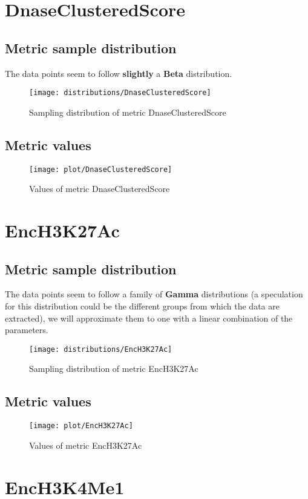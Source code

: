 \documentclass[\main/main.tex]{subfiles}
\begin{document}
\clearpage
\section{DnaseClusteredScore}
\subsection{Metric sample distribution}
The data points seem to follow \textbf{slightly} a \textbf{Beta} distribution.

\begin{figure}
  \texttt{[image: distributions/DnaseClusteredScore]}
  \caption{Sampling distribution of metric DnaseClusteredScore}
\end{figure}
\subsection{Metric values}
\begin{figure}
  \texttt{[image: plot/DnaseClusteredScore]}
  \caption{Values of metric DnaseClusteredScore}
\end{figure}

\clearpage
\section{EncH3K27Ac}
\subsection{Metric sample distribution}
The data points seem to follow a family of \textbf{Gamma} distributions (a speculation for this distribution could be the different groups from which the data are extracted), we will approximate them to one with a linear combination of the parameters.

\begin{figure}
  \texttt{[image: distributions/EncH3K27Ac]}
  \caption{Sampling distribution of metric EncH3K27Ac}
\end{figure}
\subsection{Metric values}
\begin{figure}
  \texttt{[image: plot/EncH3K27Ac]}
  \caption{Values of metric EncH3K27Ac}
\end{figure}

\clearpage
\section{EncH3K4Me1}
\end{document}

